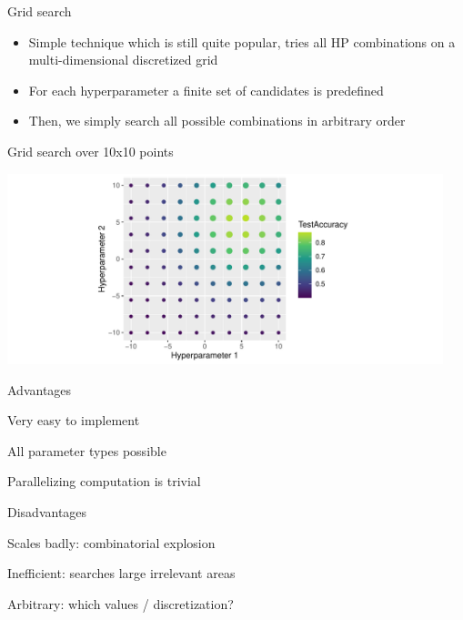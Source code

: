 \begin{vbframe}{Grid search}

\begin{itemize}
\item Simple technique which is still quite popular, tries all
HP combinations on a multi-dimensional discretized grid
\item For each hyperparameter a finite set of candidates is predefined
\item Then, we simply search all possible combinations in arbitrary order
\end{itemize}

\begin{footnotesize}
\begin{center}
Grid search over 10x10 points
\end{center}
\end{footnotesize}

\begin{knitrout}\scriptsize
{}\color{fgcolor}

{\centering \includegraphics[width=0.95\textwidth]{figure/cart_tuning_balgos_1} 
}


\end{knitrout}


\framebreak

\begin{blocki}{Advantages}
\item Very easy to implement
\item All parameter types possible
\item Parallelizing computation is trivial
\end{blocki}

\begin{blocki}{Disadvantages}
\item  Scales badly: combinatorial explosion
\item  Inefficient: searches large irrelevant areas
\item  Arbitrary: which values / discretization?
\end{blocki}
\end{vbframe}


